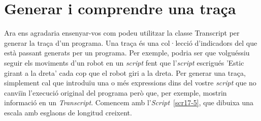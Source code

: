 \section{Generar i comprendre una traça}
Ara ens agradaria ensenyar-vos com podeu utilitzar la classe \textsf{Transcript} per generar la traça d'un programa. Una traça és una col·lecció d'indicadors del que està passant generats per un programa. Per exemple, podria ser que volguéssiu
seguir els moviments d'un robot en un \emph{script} fent que l'\emph{script} escrigués \textsf{'Estic girant a la dreta'} cada cop que el robot giri a la dreta. Per generar una traça, simplement cal que introduïu una o més expressions dins del vostre \emph{script} que no canviïn l'execució original del programa però que, per exemple, mostrin informació en un \emph{Transcript}. Comencem amb l'\emph{Script}~\ref{scr17-5}, que dibuixa una escala amb esglaons de longitud creixent.

